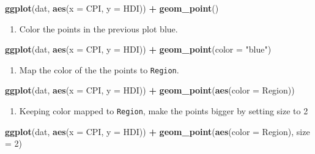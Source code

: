 \documentclass[]{book}
\newenvironment{Shaded}{\begin{snugshade}}{\end{snugshade}}
\newcommand{\DataTypeTok}[1]{\textcolor[rgb]{0.13,0.29,0.53}{#1}}
\newcommand{\DecValTok}[1]{\textcolor[rgb]{0.00,0.00,0.81}{#1}}
\newcommand{\KeywordTok}[1]{\textcolor[rgb]{0.13,0.29,0.53}{\textbf{#1}}}
\newcommand{\NormalTok}[1]{#1}
\newcommand{\OperatorTok}[1]{\textcolor[rgb]{0.81,0.36,0.00}{\textbf{#1}}}
\newcommand{\StringTok}[1]{\textcolor[rgb]{0.31,0.60,0.02}{#1}}
\providecommand{\tightlist}{%
  \setlength{\itemsep}{0pt}\setlength{\parskip}{0pt}}
\begin{document}
\begin{Shaded}
\begin{Highlighting}[]
\KeywordTok{ggplot}\NormalTok{(dat, }\KeywordTok{aes}\NormalTok{(}\DataTypeTok{x =}\NormalTok{ CPI, }\DataTypeTok{y =}\NormalTok{ HDI)) }\OperatorTok{+}
\StringTok{  }\KeywordTok{geom_point}\NormalTok{()}
\end{Highlighting}
\end{Shaded}

\begin{enumerate}
\def\labelenumi{\arabic{enumi}.}
\setcounter{enumi}{1}
\tightlist
\item
  Color the points in the previous plot blue.
\end{enumerate}

\begin{Shaded}
\begin{Highlighting}[]
\KeywordTok{ggplot}\NormalTok{(dat, }\KeywordTok{aes}\NormalTok{(}\DataTypeTok{x =}\NormalTok{ CPI, }\DataTypeTok{y =}\NormalTok{ HDI)) }\OperatorTok{+}
\StringTok{  }\KeywordTok{geom_point}\NormalTok{(}\DataTypeTok{color =} \StringTok{"blue"}\NormalTok{)}
\end{Highlighting}
\end{Shaded}

\begin{enumerate}
\def\labelenumi{\arabic{enumi}.}
\setcounter{enumi}{2}
\tightlist
\item
  Map the color of the the points to \texttt{Region}.
\end{enumerate}

\begin{Shaded}
\begin{Highlighting}[]
\KeywordTok{ggplot}\NormalTok{(dat, }\KeywordTok{aes}\NormalTok{(}\DataTypeTok{x =}\NormalTok{ CPI, }\DataTypeTok{y =}\NormalTok{ HDI)) }\OperatorTok{+}
\StringTok{  }\KeywordTok{geom_point}\NormalTok{(}\KeywordTok{aes}\NormalTok{(}\DataTypeTok{color =}\NormalTok{ Region))}
\end{Highlighting}
\end{Shaded}

\begin{enumerate}
\def\labelenumi{\arabic{enumi}.}
\setcounter{enumi}{3}
\tightlist
\item
  Keeping color mapped to \texttt{Region}, make the points bigger by setting size to 2
\end{enumerate}

\begin{Shaded}
\begin{Highlighting}[]
\KeywordTok{ggplot}\NormalTok{(dat, }\KeywordTok{aes}\NormalTok{(}\DataTypeTok{x =}\NormalTok{ CPI, }\DataTypeTok{y =}\NormalTok{ HDI)) }\OperatorTok{+}
\StringTok{  }\KeywordTok{geom_point}\NormalTok{(}\KeywordTok{aes}\NormalTok{(}\DataTypeTok{color =}\NormalTok{ Region), }\DataTypeTok{size =} \DecValTok{2}\NormalTok{)}
\end{Highlighting}
\end{Shaded}
\end{document}
